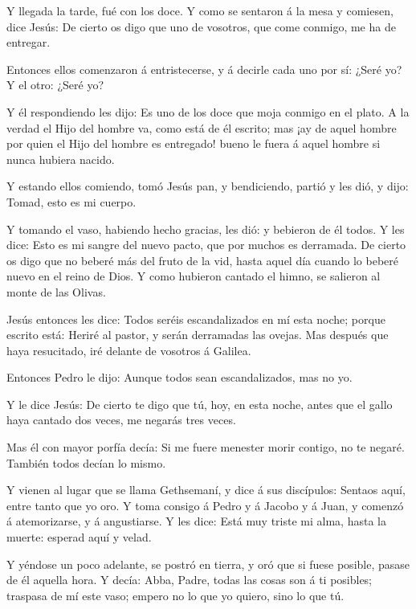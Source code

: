  Y llegada la tarde, fué con los doce.  Y como
se sentaron á la mesa y comiesen, dice Jesús: De cierto os digo que uno
de vosotros, que come conmigo, me ha de entregar.

 Entonces ellos comenzaron á entristecerse, y á decirle
cada uno por sí: ¿Seré yo? Y el otro: ¿Seré yo?

 Y él respondiendo les dijo: Es uno de los doce que moja
conmigo en el plato.  A la verdad el Hijo del hombre va,
como está de él escrito; mas ¡ay de aquel hombre por quien el Hijo del
hombre es entregado! bueno le fuera á aquel hombre si nunca hubiera
nacido.

 Y estando ellos comiendo, tomó Jesús pan, y bendiciendo,
partió y les dió, y dijo: Tomad, esto es mi cuerpo.

 Y tomando el vaso, habiendo hecho gracias, les dió: y
bebieron de él todos.  Y les dice: Esto es mi sangre del
nuevo pacto, que por muchos es derramada.  De cierto os
digo que no beberé más del fruto de la vid, hasta aquel día cuando lo
beberé nuevo en el reino de Dios.  Y como hubieron cantado
el himno, se salieron al monte de las Olivas.

 Jesús entonces les dice: Todos seréis escandalizados en mí
esta noche; porque escrito está: Heriré al pastor, y serán derramadas
las ovejas.  Mas después que haya resucitado, iré delante
de vosotros á Galilea.

 Entonces Pedro le dijo: Aunque todos sean escandalizados,
mas no yo.

 Y le dice Jesús: De cierto te digo que tú, hoy, en esta
noche, antes que el gallo haya cantado dos veces, me negarás tres veces.

 Mas él con mayor porfía decía: Si me fuere menester morir
contigo, no te negaré. También todos decían lo mismo.

 Y vienen al lugar que se llama Gethsemaní, y dice á sus
discípulos: Sentaos aquí, entre tanto que yo oro.  Y toma
consigo á Pedro y á Jacobo y á Juan, y comenzó á atemorizarse, y á
angustiarse.  Y les dice: Está muy triste mi alma, hasta la
muerte: esperad aquí y velad.

 Y yéndose un poco adelante, se postró en tierra, y oró que
si fuese posible, pasase de él aquella hora.  Y decía:
Abba, Padre, todas las cosas son á ti posibles; traspasa de mí este
vaso; empero no lo que yo quiero, sino lo que tú.

